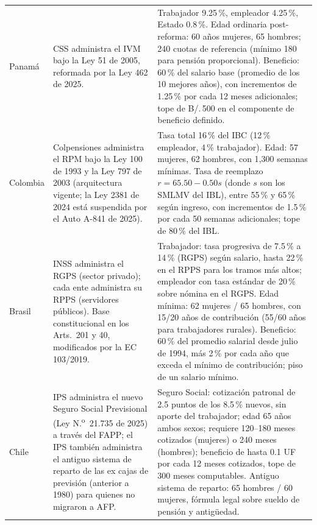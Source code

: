 \documentclass[12pt, letterpaper]{article}
\begin{document}
\begin{xltabular}{\textwidth}{P{1.7cm}Y Y}
Panamá &
CSS administra el IVM bajo la Ley 51 de 2005, reformada por la Ley 462 de 2025. &
Trabajador 9.25\,\%, empleador 4.25\,\%, Estado 0.8\,\%. Edad ordinaria post-reforma: 60 años mujeres, 65 hombres; 240 cuotas de referencia (mínimo 180 para pensión proporcional). Beneficio: 60\,\% del salario base (promedio de los 10 mejores años), con incrementos de 1.25\,\% por cada 12 meses adicionales; tope de B/.\,500 en el componente de beneficio definido. \\

Colombia &
Colpensiones administra el RPM bajo la Ley 100 de 1993 y la Ley 797 de 2003 (arquitectura vigente; la Ley 2381 de 2024 está suspendida por el Auto A-841 de 2025). &
Tasa total 16\,\% del IBC (12\,\% empleador, 4\,\% trabajador). Edad: 57 mujeres, 62 hombres, con 1{,}300 semanas mínimas. Tasa de reemplazo $r = 65.50 - 0.50s$ (donde $s$ son los SMLMV del IBL), entre 55\,\% y 65\,\% según ingreso, con incrementos de 1.5\,\% por cada 50 semanas adicionales; tope de 80\,\% del IBL. \\

Brasil &
INSS administra el RGPS (sector privado); cada ente administra su RPPS (servidores públicos). Base constitucional en los Arts.\ 201 y 40, modificados por la EC 103/2019. &
Trabajador: tasa progresiva de 7.5\,\% a 14\,\% (RGPS) según salario, hasta 22\,\% en el RPPS para los tramos más altos; empleador con tasa estándar de 20\,\% sobre nómina en el RGPS. Edad mínima: 62 mujeres / 65 hombres, con 15/20 años de contribución (55/60 años para trabajadores rurales). Beneficio: 60\,\% del promedio salarial desde julio de 1994, más 2\,\% por cada año que exceda el mínimo de contribución; piso de un salario mínimo. \\

Chile &
IPS administra el nuevo Seguro Social Previsional (Ley N.\textsuperscript{o}~21.735 de 2025) a través del FAPP; el IPS también administra el antiguo sistema de reparto de las ex cajas de previsión (anterior a 1980) para quienes no migraron a AFP. &
Seguro Social: cotización patronal de 2.5 puntos de los 8.5\,\% nuevos, sin aporte del trabajador; edad 65 años ambos sexos; requiere 120--180 meses cotizados (mujeres) o 240 meses (hombres); beneficio de hasta 0.1 UF por cada 12 meses cotizados, tope de 300 meses computables. Antiguo sistema de reparto: 65 hombres / 60 mujeres, fórmula legal sobre sueldo de pensión y antigüedad. \\

\end{xltabular}
\end{document}
